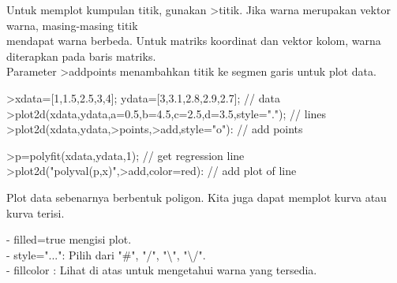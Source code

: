 \documentclass{article}
\begin{document}
\begin{eulernotebook}
\begin{eulercomment}
\begin{eulercomment}
\begin{eulercomment}
\begin{eulercomment}
\begin{eulercomment}
\begin{eulercomment}
\begin{eulercomment}
\begin{eulercomment}
\begin{eulercomment}
Untuk memplot kumpulan titik, gunakan \textgreater{}titik. Jika warna merupakan
vektor warna, masing-masing titik\\
mendapat warna berbeda. Untuk matriks koordinat dan vektor kolom,
warna diterapkan pada baris matriks.\\
Parameter \textgreater{}addpoints menambahkan titik ke segmen garis untuk plot
data.
\end{eulercomment}
\begin{eulerprompt}
>xdata=[1,1.5,2.5,3,4]; ydata=[3,3.1,2.8,2.9,2.7]; // data
>plot2d(xdata,ydata,a=0.5,b=4.5,c=2.5,d=3.5,style="."); // lines
>plot2d(xdata,ydata,>points,>add,style="o"): // add points
\end{eulerprompt}
\begin{eulerprompt}
>p=polyfit(xdata,ydata,1); // get regression line
>plot2d("polyval(p,x)",>add,color=red): // add plot of line
\end{eulerprompt}
\begin{eulercomment}
Plot data sebenarnya berbentuk poligon. Kita juga dapat memplot kurva
atau kurva terisi.

- filled=true mengisi plot.\\
- style="...": Pilih dari "#", "/", "\textbackslash{}", "\textbackslash{}/".\\
- fillcolor : Lihat di atas untuk mengetahui warna yang tersedia.


\end{eulercomment}
\end{eulercomment}
\end{eulercomment}
\end{eulercomment}
\end{eulercomment}
\end{eulercomment}
\end{eulercomment}
\end{eulercomment}
\end{eulercomment}
\end{eulernotebook}
\end{document}
